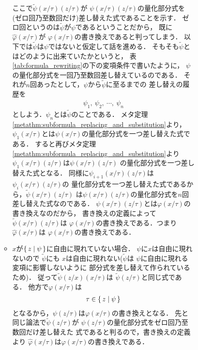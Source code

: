\begin{metaprf}[第一]
\begin{description}
\begin{description}
\begin{itemize}
\begin{itemize}
										ここで$\widetilde{\psi}(x/\tau)(z/\tau)$が
										$\psi(x/\tau)(z/\tau)$の量化部分式を
										(ゼロ回乃至数回だけ)差し替えた式であることを示す．
										ゼロ回というのは$\widetilde{\psi}$が$\psi$であるということだから，
										既に$\widehat{\varphi}(x/\tau)$が
										$\varphi(x/\tau)$の書き換えであると判ってしまう．
										以下では$\widetilde{\psi}$は$\psi$ではないと仮定して話を進める．
										そもそも$\widetilde{\psi}$とはどのように出来ていたかというと，
										表\ref{tab:formula_rewriting}の下の変項条件で書いたように，
										$\psi$の量化部分式を一回乃至数回差し替えているのである．
										それが$n$回あったとして，$\psi$から$\widetilde{\psi}$に至るまでの
										差し替えの履歴を
										\begin{align}
											\psi_{1},\ \psi_{2},\ \cdots,\ \psi_{n}
										\end{align}
										としよう．$\psi_{n}$とは$\widetilde{\psi}$のことである．
										メタ定理\ref{metathm:subformula_replacing_and_substitution}より，
										$\psi_{1}(x/\tau)$とは$\psi(x/\tau)$の量化部分式を一つ差し替えた式である．
										すると再びメタ定理\ref{metathm:subformula_replacing_and_substitution}より
										$\psi_{1}(x/\tau)(z/\tau)$は$\psi(x/\tau)(z/\tau)$
										の量化部分式を一つ差し替えた式となる．
										同様に$\psi_{i+1}(x/\tau)(z/\tau)$は$\psi_{i}(x/\tau)(z/\tau)$の
										量化部分式を一つ差し替えた式であるから，$\widetilde{\psi}(x/\tau)(z/\tau)$
										は$\psi(x/\tau)(z/\tau)$の量化部分式を$n$回差し替えた式なのである．
										$\psi(x/\tau)(z/\tau)$とは$\varphi(x/\tau)$の書き換えなのだから，
										書き換えの定義によって$\widetilde{\psi}(x/\tau)(z/\tau)$は
										$\varphi(x/\tau)$の書き換えである．つまり$\widehat{\varphi}(x/\tau)$は
										$\varphi(x/\tau)$の書き換えである．
										
										
									\item $x$が$\{\, z \mid \psi\, \}$に自由に現れていない場合．
										$\psi$に$x$は自由に現れないので
										$\widetilde{\psi}$にも
										$x$は自由に現れない($\widetilde{\psi}$は
										$\psi$に自由に現れる変項に影響しないように
										部分式を差し替えて作られているため)．
										従って$\widetilde{\psi}(z/x)(x/\tau)$は
										$\widetilde{\psi}(z/\tau)$と同じ式である．
										他方で$\varphi(x/\tau)$は
										\begin{align}
											\tau \in \{\, z \mid \psi\, \}
										\end{align}
										となるから，$\psi(z/\tau)$は$\varphi(x/\tau)$の書き換えとなる．
										先と同じ論法で$\widetilde{\psi}(z/\tau)$が
										$\psi(z/\tau)$の量化部分式をゼロ回乃至数回だけ差し替えた
										式であると判るので，書き換えの定義より
										$\widehat{\varphi}(x/\tau)$は$\varphi(x/\tau)$の書き換えである．
								\end{itemize}
						\end{itemize}
						

\end{description}
\end{description}
\end{metaprf}
